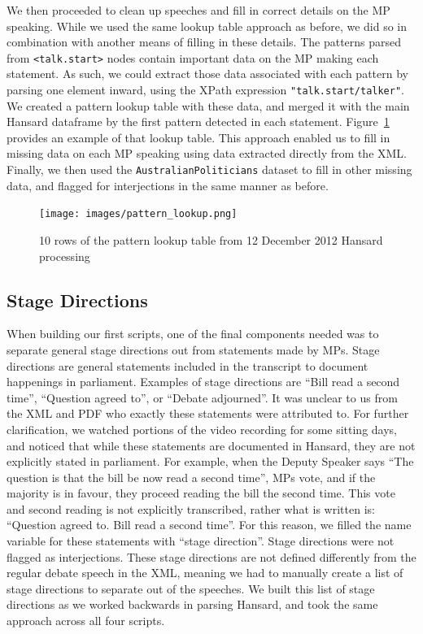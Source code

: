 \documentclass[
  letterpaper,
  DIV=11,
  numbers=noendperiod]{scrartcl}
\begin{document}
We then proceeded to clean up speeches and fill in correct details on
the MP speaking. While we used the same lookup table approach as before,
we did so in combination with another means of filling in these details.
The patterns parsed from \texttt{\textless{}talk.start\textgreater{}}
nodes contain important data on the MP making each statement. As such,
we could extract those data associated with each pattern by parsing one
element inward, using the XPath expression \texttt{"talk.start/talker"}.
We created a pattern lookup table with these data, and merged it with
the main Hansard dataframe by the first pattern detected in each
statement. Figure~\ref{fig-patterns} provides an example of that lookup
table. This approach enabled us to fill in missing data on each MP
speaking using data extracted directly from the XML. Finally, we then
used the \texttt{AustralianPoliticians} dataset to fill in other missing
data, and flagged for interjections in the same manner as before.

\begin{figure}

{\centering \texttt{[image: images/pattern\_lookup.png]}

}

\caption{\label{fig-patterns}10 rows of the pattern lookup table from 12
December 2012 Hansard processing}

\end{figure}

\hypertarget{sec-stage}{%
\subsection{Stage Directions}\label{sec-stage}}

When building our first scripts, one of the final components needed was
to separate general stage directions out from statements made by MPs.
Stage directions are general statements included in the transcript to
document happenings in parliament. Examples of stage directions are
``Bill read a second time'', ``Question agreed to'', or ``Debate
adjourned''. It was unclear to us from the XML and PDF who exactly these
statements were attributed to. For further clarification, we watched
portions of the video recording for some sitting days, and noticed that
while these statements are documented in Hansard, they are not
explicitly stated in parliament. For example, when the Deputy Speaker
says ``The question is that the bill be now read a second time'', MPs
vote, and if the majority is in favour, they proceed reading the bill
the second time. This vote and second reading is not explicitly
transcribed, rather what is written is: ``Question agreed to. Bill read
a second time''. For this reason, we filled the name variable for these
statements with ``stage direction''. Stage directions were not flagged
as interjections. These stage directions are not defined differently
from the regular debate speech in the XML, meaning we had to manually
create a list of stage directions to separate out of the speeches. We
built this list of stage directions as we worked backwards in parsing
Hansard, and took the same approach across all four scripts.
\end{document}
